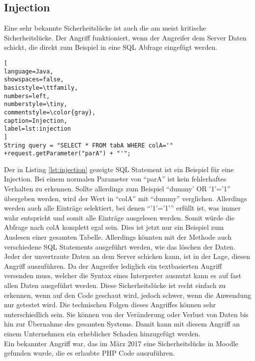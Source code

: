 \subsection{Injection}
Eine sehr bekannte Sicherheitslücke ist auch die am meist kritische Sicherheitslücke. Der Angriff funktioniert, wenn der Angreifer dem Server Daten schickt, die direkt zum Beispiel in eine SQL Abfrage eingefügt werden.\\
\begin{lstlisting}[
language=Java,
showspaces=false,
basicstyle=\ttfamily,
numbers=left,
numberstyle=\tiny,
commentstyle=\color{gray},
caption=Injection,
label=lst:injection
]
String query = "SELECT * FROM tabA WHERE colA='" +request.getParameter("parA") + "'";
\end{lstlisting}
Der in Listing \ref{lst:injection} gezeigte SQL Statement ist ein Beispiel für eine Injection. Bei einem normalen Parameter von \enquote{parA} ist kein fehlerhaftes Verhalten zu erkennen. Sollte allerdings zum Beispiel \enquote{dummy' OR '1'='1} übergeben werden, wird der Wert in \enquote{colA} mit \enquote{dummy} verglichen. Allerdings werden auch alle Einträge selektiert, bei denen \enquote{'1'='1'} erfüllt ist, was immer wahr entspricht und somit alle Einträge ausgelesen werden. Somit würde die Abfrage nach colA komplett egal sein. Dies ist jetzt nur ein Beispiel zum Auslesen einer gesamten Tabelle. Allerdings könnten mit der Methode auch verschiedene SQL Statements ausgeführt werden, wie das löschen der Daten. \\
Jeder der unvertraute Daten an dem Server schicken kann, ist in der Lage, diesen Angriff auszuführen. Da der Angreifer lediglich ein textbasierten Angriff versenden muss, welcher die Syntax eines Interpreter ausnutzt kann es auf fast allen Daten ausgeführt werden. Diese Sicherheitslücke ist recht einfach zu erkennen, wenn auf den Code geschaut wird, jedoch schwer, wenn die Anwendung nur getestet wird. Die technischen Folgen dieses Angriffes können sehr unterschiedlich sein. Sie können von der Veränderung oder Verlust von Daten bis hin zur Übernahme des gesamten Systems. Damit kann mit diesem Angriff an einem Unternehmen ein erheblicher Schaden hinzugefügt werden. \\
Ein bekannter Angriff war, das im März 2017 eine Sicherheitslücke in Moodle gefunden wurde, die es erlaubte PHP Code auszuführen.
